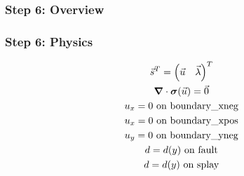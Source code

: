 \documentclass[aspectratio=169]{beamer}
\begin{document}
\begin{frame}
  \frametitle{Step 6: Overview}

      
\end{frame}


\begin{frame}
  \frametitle{Step 6: Physics}
  \summary{}

  \begin{minipage}{0.3\textwidth}
    {\scriptsize
    \begin{gather*}
    \vec{s}^T = \left( \vec{u} \quad \vec{\lambda} \right)^T \\
    \bm{\nabla} \cdot \bm{\sigma}(\vec{u}) = \vec{0} \\
    u_x = 0 \text{ on boundary\_xneg} \\
    u_x = 0 \text{ on boundary\_xpos} \\
    u_y = 0 \text{ on boundary\_yneg} \\
    d = d(y) \text{ on fault} \\
    d = d(y) \text{ on splay}
    \end{gather*}}
  \end{minipage}
  \hfill
  \begin{minipage}{0.67\textwidth}
  \end{minipage}
      
\end{frame}
\end{document}
